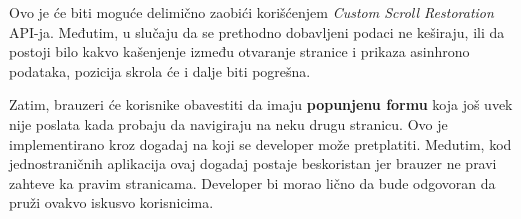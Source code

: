 Ovo je će biti moguće delimično zaobići korišćenjem \textit{Custom Scroll Restoration} API-ja.
Međutim, u slučaju da se prethodno dobavljeni podaci ne keširaju, ili da postoji bilo kakvo kašenjenje između otvaranje stranice i prikaza asinhrono podataka, pozicija skrola će i dalje biti pogrešna.

Zatim, brauzeri će korisnike obavestiti da imaju \textbf{popunjenu formu} koja još uvek nije poslata kada probaju da navigiraju na neku drugu stranicu.
Ovo je implementirano kroz dogadaj  na koji se developer može pretplatiti.
Medutim, kod jednostraničnih aplikacija ovaj dogadaj postaje beskoristan jer brauzer ne pravi zahteve ka pravim stranicama.
Developer bi morao lično da bude odgovoran da pruži ovakvo iskusvo korisnicima.
